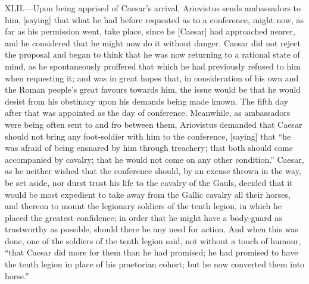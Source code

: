 XLII.—Upon being apprised of Caesar's arrival, Ariovistus sends
ambassadors to him, [saying] that what he had before requested as to a
conference, might now, as far as his permission went, take place, since
he [Caesar] had approached nearer, and he considered that he might now
do it without danger. Caesar did not reject the proposal and began to
think that he was now returning to a rational state of mind, as he
spontaneously proffered that which he had previously refused to him when
requesting it; and was in great hopes that, in consideration of his own
and the Roman people's great favours towards him, the issue would be
that he would desist from his obstinacy upon his demands being made
known. The fifth day after that was appointed as the day of conference.
Meanwhile, as ambassadors were being often sent to and fro between them,
Ariovistus demanded that Caesar should not bring any foot-soldier with
him to the conference, [saying] that ``he was afraid of being ensnared by
him through treachery; that both should come accompanied by cavalry;
that he would not come on any other condition.'' Caesar, as he neither
wished that the conference should, by an excuse thrown in the way, be
set aside, nor durst trust his life to the cavalry of the Gauls, decided
that it would be most expedient to take away from the Gallic cavalry all
their horses, and thereon to mount the legionary soldiers of the tenth
legion, in which he placed the greatest confidence; in order that he
might have a body-guard as trustworthy as possible, should there be any
need for action. And when this was done, one of the soldiers of the
tenth legion said, not without a touch of humour, ``that Caesar did more
for them than he had promised; he had promised to have the tenth legion
in place of his praetorian cohort; but he now converted them into
horse.''

